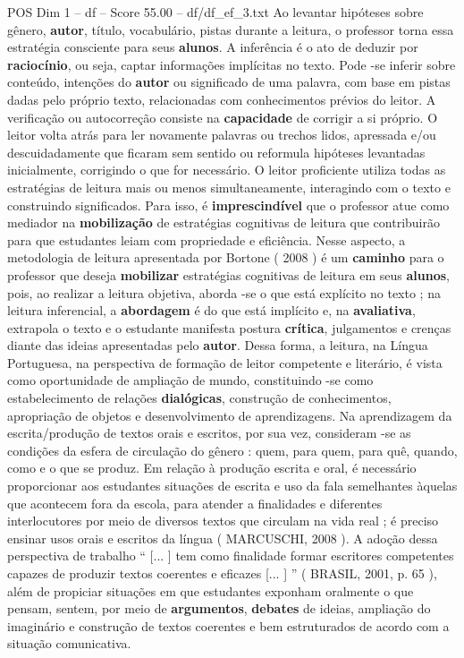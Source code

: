 \begin{textsample}{POS Dim 1 – df – Score 55.00 – df/df\_ef\_3.txt}
Ao levantar hipóteses sobre gênero, \textbf{autor}, título, vocabulário, pistas durante a leitura, o professor torna essa estratégia consciente para seus \textbf{alunos}.
A inferência é o ato de deduzir por \textbf{raciocínio}, ou seja, captar informações implícitas no texto.
Pode -se inferir sobre conteúdo, intenções do \textbf{autor} ou significado de uma palavra, com base em pistas dadas pelo próprio texto, relacionadas com conhecimentos prévios do leitor.
A verificação ou autocorreção consiste na \textbf{capacidade} de corrigir a si próprio.
O leitor volta atrás para ler novamente palavras ou trechos lidos, apressada e/ou descuidadamente que ficaram sem sentido ou reformula hipóteses levantadas inicialmente, corrigindo o que for necessário.
O leitor proficiente utiliza todas as estratégias de leitura mais ou menos simultaneamente, interagindo com o texto e construindo significados.
Para isso, é \textbf{imprescindível} que o professor atue como mediador na \textbf{mobilização} de estratégias cognitivas de leitura que contribuirão para que estudantes leiam com propriedade e eficiência.
Nesse aspecto, a metodologia de leitura apresentada por Bortone ( 2008 ) é um \textbf{caminho} para o professor que deseja \textbf{mobilizar} estratégias cognitivas de leitura em seus \textbf{alunos}, pois, ao realizar a leitura objetiva, aborda -se o que está explícito no texto ; na leitura inferencial, a \textbf{abordagem} é do que está implícito e, na \textbf{avaliativa}, extrapola o texto e o estudante manifesta postura \textbf{crítica}, julgamentos e crenças diante das ideias apresentadas pelo \textbf{autor}.
Dessa forma, a leitura, na Língua Portuguesa, na perspectiva de formação de leitor competente e literário, é vista como oportunidade de ampliação de mundo, constituindo -se como estabelecimento de relações \textbf{dialógicas}, construção de conhecimentos, apropriação de objetos e desenvolvimento de aprendizagens.
Na aprendizagem da escrita/produção de textos orais e escritos, por sua vez, consideram -se as condições da esfera de circulação do gênero : quem, para quem, para quê, quando, como e o que se produz.
Em relação à produção escrita e oral, é necessário proporcionar aos estudantes situações de escrita e uso da fala semelhantes àquelas que acontecem fora da escola, para atender a finalidades e diferentes interlocutores por meio de diversos textos que circulam na vida real ; é preciso ensinar usos orais e escritos da língua ( MARCUSCHI, 2008 ).
A adoção dessa perspectiva de trabalho “ [... ] tem como finalidade formar escritores competentes capazes de produzir textos coerentes e eficazes [... ] ” ( BRASIL, 2001, p. 65 ), além de propiciar situações em que estudantes exponham oralmente o que pensam, sentem, por meio de \textbf{argumentos}, \textbf{debates} de ideias, ampliação do imaginário e construção de textos coerentes e bem estruturados de acordo com a situação comunicativa.

\end{textsample}
